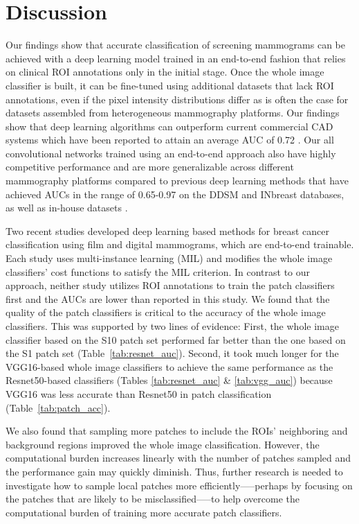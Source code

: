 \documentclass[12pt,letterpaper]{article}
\begin{document}
\section{Discussion}
Our findings show that accurate classification of screening mammograms can be achieved with a deep learning model trained in an end-to-end fashion that relies on clinical ROI annotations only in the initial stage. Once the whole image classifier is built, it can be fine-tuned using additional datasets that lack ROI annotations, even if the pixel intensity distributions differ as is often the case for datasets assembled from heterogeneous mammography platforms. Our findings show that deep learning algorithms can outperform current commercial CAD systems which have been reported to attain an average AUC of 0.72 \cite{cole_impact_2014}. Our all convolutional networks trained using an end-to-end approach also have highly competitive performance and are more generalizable across different mammography platforms compared to previous deep learning methods that have achieved AUCs in the range of 0.65-0.97 on the DDSM and INbreast databases, as well as in-house datasets \cite{burt_deep_2018}.

Two recent studies \cite{zhu_deep_2017,choukroun_mammogram_2017} developed deep learning based methods for breast cancer classification using film and digital mammograms, which are end-to-end trainable. Each study uses multi-instance learning (MIL) and modifies the whole image classifiers' cost functions to satisfy the MIL criterion. In contrast to our approach, neither study utilizes ROI annotations to train the patch classifiers first and the AUCs are lower than reported in this study. We found that the quality of the patch classifiers is critical to the accuracy of the whole image classifiers. This was supported by two lines of evidence: First, the whole image classifier based on the S10 patch set performed far better than the one based on the S1 patch set (Table~\ref{tab:resnet_auc}). Second, it took much longer for the VGG16-based whole image classifiers to achieve the same performance as the Resnet50-based classifiers (Tables \ref{tab:resnet_auc} \& \ref{tab:vgg_auc}) because VGG16 was less accurate than Resnet50 in patch classification (Table~\ref{tab:patch_acc}).

We also found that sampling more patches to include the ROIs' neighboring and background regions improved the whole image classification. However, the computational burden increases linearly with the number of patches sampled and the performance gain may quickly diminish. Thus, further research is needed to investigate how to sample local patches more efficiently—--perhaps by focusing on the patches that are likely to be misclassified—--to help overcome the computational burden of training more accurate patch classifiers.
\end{document}
